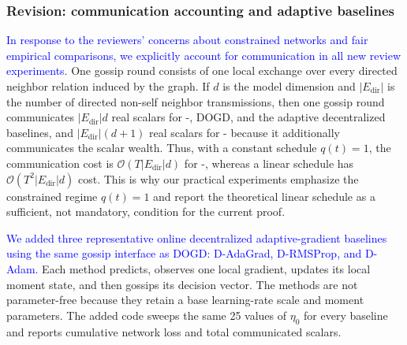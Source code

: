 \subsubsection*{Revision: communication accounting and adaptive baselines}
\textcolor{blue}{In response to the reviewers' concerns about constrained networks and fair empirical comparisons, we explicitly account for communication in all new review experiments.}
One gossip round consists of one local exchange over every directed neighbor relation induced by the graph.
If $d$ is the model dimension and $|E_{\mathrm{dir}}|$ is the number of directed non-self neighbor transmissions, then one gossip round communicates $|E_{\mathrm{dir}}|d$ real scalars for \algname{}-, DOGD, and the adaptive decentralized baselines, and $|E_{\mathrm{dir}}|(d+1)$ real scalars for \algname{}- because it additionally communicates the scalar wealth.
Thus, with a constant schedule $q(t)=1$, the communication cost is $\mathcal{O}(T |E_{\mathrm{dir}}| d)$ for \algname{}-, whereas a linear schedule has $\mathcal{O}(T^2 |E_{\mathrm{dir}}| d)$ cost.
This is why our practical experiments emphasize the constrained regime $q(t)=1$ and report the theoretical linear schedule as a sufficient, not mandatory, condition for the current proof.

\textcolor{blue}{We added three representative online decentralized adaptive-gradient baselines using the same gossip interface as DOGD: D-AdaGrad, D-RMSProp, and D-Adam.}
Each method predicts, observes one local gradient, updates its local moment state, and then gossips its decision vector.
The methods are not parameter-free because they retain a base learning-rate scale and moment parameters.
The added code sweeps the same 25 values of $\eta_0$ for every baseline and reports cumulative network loss and total communicated scalars.
